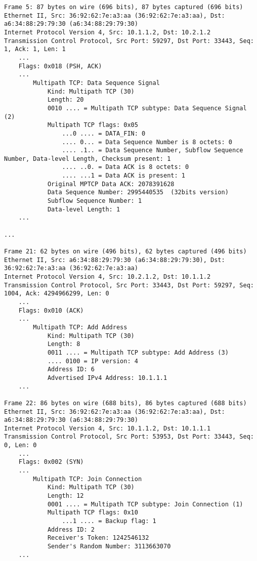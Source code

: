 \begin{verbatim}
Frame 5: 87 bytes on wire (696 bits), 87 bytes captured (696 bits)
Ethernet II, Src: 36:92:62:7e:a3:aa (36:92:62:7e:a3:aa), Dst: a6:34:88:29:79:30 (a6:34:88:29:79:30)
Internet Protocol Version 4, Src: 10.1.1.2, Dst: 10.2.1.2
Transmission Control Protocol, Src Port: 59297, Dst Port: 33443, Seq: 1, Ack: 1, Len: 1
    ...
    Flags: 0x018 (PSH, ACK)
    ...
        Multipath TCP: Data Sequence Signal
            Kind: Multipath TCP (30)
            Length: 20
            0010 .... = Multipath TCP subtype: Data Sequence Signal (2)
            Multipath TCP flags: 0x05
                ...0 .... = DATA_FIN: 0
                .... 0... = Data Sequence Number is 8 octets: 0
                .... .1.. = Data Sequence Number, Subflow Sequence Number, Data-level Length, Checksum present: 1
                .... ..0. = Data ACK is 8 octets: 0
                .... ...1 = Data ACK is present: 1
            Original MPTCP Data ACK: 2078391628
            Data Sequence Number: 2995440535  (32bits version)
            Subflow Sequence Number: 1
            Data-level Length: 1
    ...

...

Frame 21: 62 bytes on wire (496 bits), 62 bytes captured (496 bits)
Ethernet II, Src: a6:34:88:29:79:30 (a6:34:88:29:79:30), Dst: 36:92:62:7e:a3:aa (36:92:62:7e:a3:aa)
Internet Protocol Version 4, Src: 10.2.1.2, Dst: 10.1.1.2
Transmission Control Protocol, Src Port: 33443, Dst Port: 59297, Seq: 1004, Ack: 4294966299, Len: 0
    ...
    Flags: 0x010 (ACK)
    ...
        Multipath TCP: Add Address
            Kind: Multipath TCP (30)
            Length: 8
            0011 .... = Multipath TCP subtype: Add Address (3)
            .... 0100 = IP version: 4
            Address ID: 6
            Advertised IPv4 Address: 10.1.1.1
    ...

Frame 22: 86 bytes on wire (688 bits), 86 bytes captured (688 bits)
Ethernet II, Src: 36:92:62:7e:a3:aa (36:92:62:7e:a3:aa), Dst: a6:34:88:29:79:30 (a6:34:88:29:79:30)
Internet Protocol Version 4, Src: 10.1.1.2, Dst: 10.1.1.1
Transmission Control Protocol, Src Port: 53953, Dst Port: 33443, Seq: 0, Len: 0
    ...
    Flags: 0x002 (SYN)
    ...
        Multipath TCP: Join Connection
            Kind: Multipath TCP (30)
            Length: 12
            0001 .... = Multipath TCP subtype: Join Connection (1)
            Multipath TCP flags: 0x10
                ...1 .... = Backup flag: 1
            Address ID: 2
            Receiver's Token: 1242546132
            Sender's Random Number: 3113663070
    ...


\end{verbatim}
